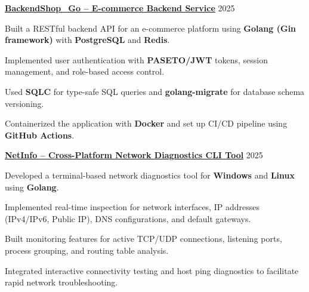 \begin{cventries} %
  \cvsimpleentry
    {\href{https://github.com/truongtvn6/BackendShop_Go}{\textbf{BackendShop\_Go -- E-commerce Backend Service}}} %
    {2025} %
    {
      \begin{cvitems} %
        \item {Built a RESTful backend API for an e-commerce platform using \textbf{Golang (Gin framework)} with \textbf{PostgreSQL} and \textbf{Redis}.}
        \item {Implemented user authentication with \textbf{PASETO/JWT} tokens, session management, and role-based access control.}
        \item {Used \textbf{SQLC} for type-safe SQL queries and \textbf{golang-migrate} for database schema versioning.}
        \item {Containerized the application with \textbf{Docker} and set up CI/CD pipeline using \textbf{GitHub Actions}.}
      \end{cvitems}
    }


  \cvsimpleentry
    {\href{https://github.com/truongtvn6/NetInfo}{\textbf{NetInfo -- Cross-Platform Network Diagnostics CLI Tool}}} %
    {2025} %
    {
      \begin{cvitems} %
        \item {Developed a terminal-based network diagnostics tool for \textbf{Windows} and \textbf{Linux} using \textbf{Golang}.}
        \item {Implemented real-time inspection for network interfaces, IP addresses (IPv4/IPv6, Public IP), DNS configurations, and default gateways.}
        \item {Built monitoring features for active TCP/UDP connections, listening ports, process grouping, and routing table analysis.}
        \item {Integrated interactive connectivity testing and host ping diagnostics to facilitate rapid network troubleshooting.}
      \end{cvitems}
    }
\end{cventries}
